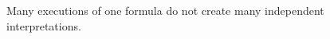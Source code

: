 \begin{figure}[H]
\centering
{}
\caption{Many executions of one formula do not create many independent interpretations.}\label{fig:teach-M09-01}
\end{figure}
